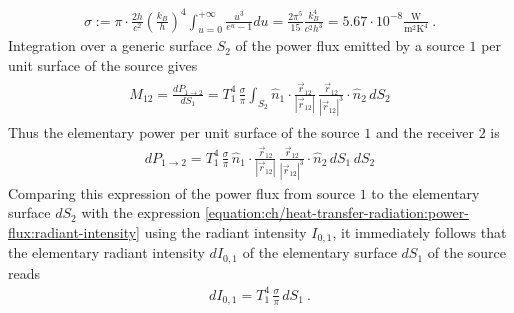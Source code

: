 \documentclass[letterpaper,10pt,english]{jupyterBook}
\begin{document}
\begin{equation*}
\begin{split}\sigma := \pi \cdot \frac{2 h}{c^2} \left( \frac{k_B}{h} \right)^4 \int_{u=0}^{+\infty} \frac{u^3}{e^{u}-1} du = \frac{2 \pi^5}{15}\frac{k_B^4}{c^2 h^3} = 5.67 \cdot 10^{-8} \frac{\text{W}}{\text{m}^2 \text{K}^4} \ .\end{split}
\end{equation*}
\sphinxAtStartPar
Integration over a generic surface \(S_2\) of the power flux emitted by a source \(1\) per unit surface of the source gives
\begin{equation*}
\begin{split}\begin{aligned}
  M_{12} = \frac{d P_{1 \rightarrow 2} }{d S_1} = T_1^4 \, \frac{\sigma}{\pi} \int_{S_2} \hat{n}_1 \cdot \frac{\vec{r}_{12}}{|\vec{r}_{12}|} \, \frac{\vec{r}_{12}}{|\vec{r}_{12}|^3} \cdot \hat{n}_2 \, dS_2
\end{aligned}\end{split}
\end{equation*}
\sphinxAtStartPar
Thus the elementary power per unit surface of the source \(1\) and the receiver \(2\) is
\begin{equation*}
\begin{split}dP_{1 \rightarrow 2} = T_1^4 \, \frac{\sigma}{\pi} \, \hat{n}_1 \cdot \frac{\vec{r}_{12}}{|\vec{r}_{12}|} \, \frac{\vec{r}_{12}}{|\vec{r}_{12}|^3} \cdot \hat{n}_2 \, dS_1 \, dS_2 \end{split}
\end{equation*}
\sphinxAtStartPar
Comparing this expression of the power flux from source \(1\) to the elementary surface \(d S_2\) with the expression \eqref{equation:ch/heat-transfer-radiation:power-flux:radiant-intensity} using the radiant intensity \(I_{0,1}\), it immediately follows that the elementary radiant intensity \(d I_{0,1}\) of the elementary surface \(d S_1\) of the source reads
\begin{equation*}
\begin{split}d I_{0,1} = T_1^4 \, \frac{\sigma}{\pi} \, d S_1 \ .\end{split}
\end{equation*}
\end{document}
